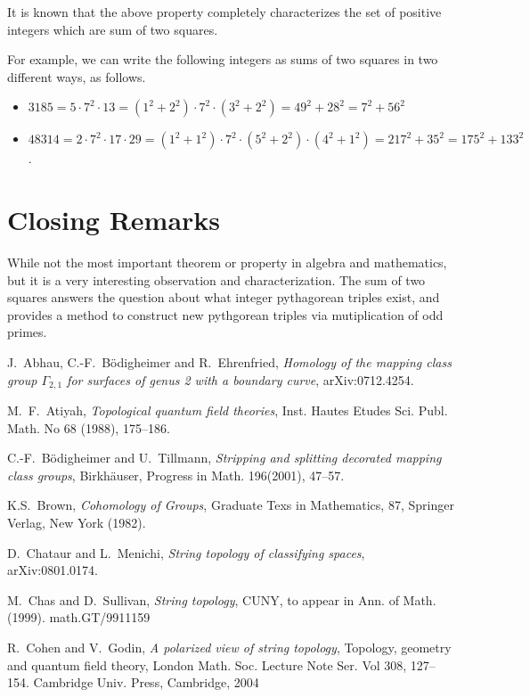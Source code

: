 \documentclass[12pt]{article}
\begin{document}
It is known that the above property completely characterizes the set of positive integers which are sum of two squares. 

For example, we can write the following integers as sums of two squares in two different ways, as follows.
\begin{itemize}
\item $3185=5\cdot 7^2\cdot13= (1^2 + 2^2) \cdot 7^2 \cdot (3^2 + 2^2) = 49^2 + 28^2 = 7^2 + 56^2$
\item $48314=2\cdot7^2\cdot17\cdot29= (1^2 + 1^2) \cdot 7^2 \cdot (5^2 + 2^2) \cdot (4^2 + 1^2) = 217^2 + 35^2 = 175^2 + 133^2$.
\end{itemize}





\section{Closing Remarks}

While not the most important theorem or property in algebra and mathematics, but it is
a very interesting observation and characterization. The sum of two squares answers the question 
about what integer pythagorean triples exist, and provides a method to construct new pythgorean triples
via mutiplication of odd primes.


\begin{thebibliography}{ABE} 

 J.~Abhau, C.-F.~B\"odigheimer and R.~Ehrenfried, \emph{Homology of the mapping class group $\Gamma_{2,1}$ for surfaces of genus 2 with a boundary curve}, arXiv:0712.4254. 

 M.~F.~Atiyah, \emph{Topological quantum field theories}, Inst. Hautes Etudes Sci. Publ. Math. No 68 (1988), 175--186. 

 C.-F.~B\"odigheimer and U.~Tillmann, \emph{Stripping and splitting decorated mapping class groups}, Birkh\"auser, Progress in Math. 196(2001), 47--57.

 K.S.~Brown, \emph{Cohomology of Groups}, Graduate Texs in Mathematics, 87, Springer Verlag, New York (1982). 

 D.~Chataur and L.~Menichi, \emph{String topology of classifying spaces}, arXiv:0801.0174. 


 M.~Chas and D.~Sullivan, \emph{String topology}, CUNY,
to appear in Ann. of Math. (1999). math.GT/9911159
 
 R.~Cohen and V.~Godin, \emph{A polarized view of string
  topology}, Topology, geometry and quantum field theory, London
  Math. Soc. Lecture Note Ser. Vol 308, 127--154. Cambridge
  Univ. Press, Cambridge, 2004
  
\end{thebibliography}
\end{document}
